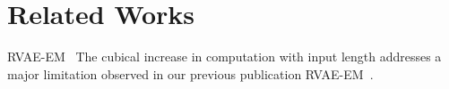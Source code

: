 \section{Related Works}
\label{sec:related_works}








RVAE-EM~\cite{wang2024rvae}
The cubical increase in computation with input length addresses a major limitation observed in our previous publication RVAE-EM~\cite{wang2024rvae}.








